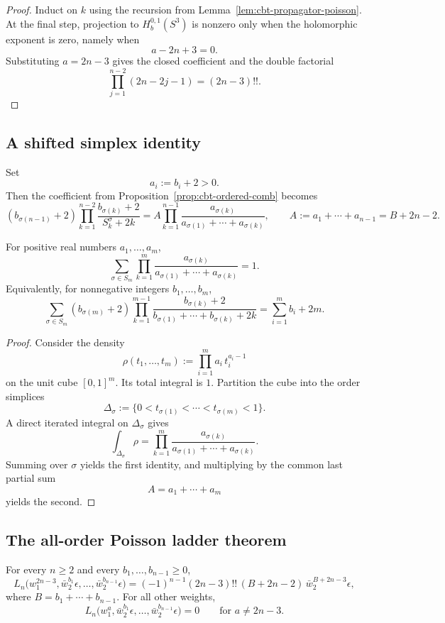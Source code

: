 \begin{proof}
Induct on $k$ using the recursion from Lemma~\ref{lem:cbt-propagator-poisson}. At the final step, projection to $H_b^{0,1}(S^3)$ is nonzero only when the holomorphic exponent is zero, namely when
\[
a-2n+3=0.
\]
Substituting $a=2n-3$ gives the closed coefficient and the double factorial
\[
\prod_{j=1}^{n-2}(2n-2j-1)=(2n-3)!!.
\]
\end{proof}

\subsection{A shifted simplex identity}

Set
\[
a_i:=b_i+2>0.
\]
Then the coefficient from Proposition~\ref{prop:cbt-ordered-comb} becomes
\[
(b_{\sigma(n-1)}+2)\prod_{k=1}^{n-2}
\frac{b_{\sigma(k)}+2}{S_k^\sigma+2k}
=
A\prod_{k=1}^{n-1}
\frac{a_{\sigma(k)}}{a_{\sigma(1)}+\cdots+a_{\sigma(k)}},
\qquad
A:=a_1+\cdots+a_{n-1}=B+2n-2.
\]

\begin{theorem}
For positive real numbers $a_1,\dots,a_m$,
\[
\sum_{\sigma\in S_m}
\prod_{k=1}^{m}
\frac{a_{\sigma(k)}}{a_{\sigma(1)}+\cdots+a_{\sigma(k)}}=1.
\]
Equivalently, for nonnegative integers $b_1,\dots,b_m$,
\[
\sum_{\sigma\in S_m}
(b_{\sigma(m)}+2)\prod_{k=1}^{m-1}
\frac{b_{\sigma(k)}+2}{b_{\sigma(1)}+\cdots+b_{\sigma(k)}+2k}
=
\sum_{i=1}^{m}b_i+2m.
\]
\end{theorem}

\begin{proof}
Consider the density
\[
\rho(t_1,\dots,t_m):=\prod_{i=1}^m a_i\,t_i^{a_i-1}
\]
on the unit cube $[0,1]^m$. Its total integral is $1$. Partition the cube into the order simplices
\[
\Delta_\sigma:=\{0<t_{\sigma(1)}<\cdots<t_{\sigma(m)}<1\}.
\]
A direct iterated integral on $\Delta_\sigma$ gives
\[
\int_{\Delta_\sigma}\rho
=
\prod_{k=1}^{m}
\frac{a_{\sigma(k)}}{a_{\sigma(1)}+\cdots+a_{\sigma(k)}}.
\]
Summing over $\sigma$ yields the first identity, and multiplying by the common last partial sum
\[
A=a_1+\cdots+a_m
\]
yields the second.
\end{proof}

\subsection{The all-order Poisson ladder theorem}

\begin{theorem}
For every $n\ge2$ and every $b_1,\dots,b_{n-1}\ge0$,
\[
L_n\bigl(w_1^{2n-3},\bar w_2^{b_1}\epsilon,\dots,\bar w_2^{b_{n-1}}\epsilon\bigr)
=
(-1)^{n-1}(2n-3)!!\,(B+2n-2)\,\bar w_2^{B+2n-3}\epsilon,
\]
where $B=b_1+\cdots+b_{n-1}$. For all other weights,
\[
L_n\bigl(w_1^a,\bar w_2^{b_1}\epsilon,\dots,\bar w_2^{b_{n-1}}\epsilon\bigr)=0
\qquad\text{for } a\neq 2n-3.
\]
\end{theorem}

